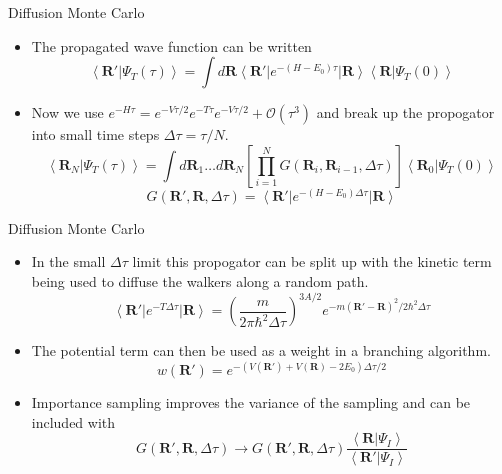 \documentclass{beamer}
\newcommand{\ket}[1]{\left| #1 \right>}
\newcommand{\bra}[1]{\left< #1 \right|}
\newcommand{\braket}[2]{\left< #1 | #2 \right>}
\newcommand{\R}{\mathbf{R}}
\newcommand{\dt}{\Delta\tau}
\begin{document}
\begin{frame}{Diffusion Monte Carlo}
\begin{itemize}
   \item The propagated wave function can be written
   \begin{equation*}
      \braket{\R'}{\Psi_T(\tau)} = \int d\R \bra{\R'}e^{-(H-E_0)\tau}\ket{\R}\braket{\R}{\Psi_T(0)}
   \end{equation*}
   \item Now we use $e^{-H\tau}=e^{-V\tau/2}e^{-T\tau}e^{-V\tau/2}+\mathcal{O}(\tau^3)$ and break up the propogator into small time steps $\dt = \tau/N$.
   \begin{equation*}
      \braket{\R_N}{\Psi_T(\tau)} = \int d\R_1 \ldots d\R_N \left[\prod\limits_{i=1}^N G(\R_i,\R_{i-1},\Delta\tau)\right] \braket{\R_0}{\Psi_T(0)}
   \end{equation*}
   \begin{equation*}
      G(\R',\R,\Delta\tau) = \bra{\R'}e^{-(H-E_0)\Delta\tau}\ket{\R}
   \end{equation*}
\end{itemize}
\end{frame}

\begin{frame}{Diffusion Monte Carlo}
\begin{itemize}
   \item In the small $\dt$ limit this propogator can be split up with the kinetic term being used to diffuse the walkers along a random path.
   \begin{equation*}
      \bra{\R'}e^{-T\Delta \tau}\ket{\R} = \left(\frac{m}{2\pi\hbar^2\Delta\tau}\right)^{3A/2}e^{-m(\R'-\R)^2/2\hbar^2\Delta\tau}
   \end{equation*}
   \item The potential term can then be used as a weight in a branching algorithm.
   \begin{equation*}
      w(\R') = e^{-\left(V\left(\R'\right)+V\left(\R\right)-2E_0\right)\Delta\tau/2}%
   \end{equation*}
   \item Importance sampling improves the variance of the sampling and can be included with
   \begin{equation*}
      G(\R',\R,\Delta\tau) \rightarrow G(\R',\R,\Delta\tau)\frac{\braket{\R}{\Psi_I}}{\braket{\R'}{\Psi_I}}
   \end{equation*}
\end{itemize}
\end{frame}
\end{document}
